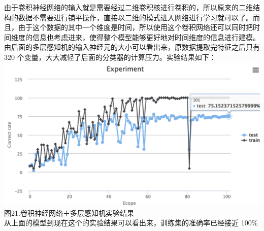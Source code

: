 由于卷积神经网络的输入就是需要经过二维卷积核进行卷积的，所以原来的二维结构的数据不需要进行铺平操作，直接以二维的模式进入网络进行学习就可以了。而且，由于这个数据的其中一个维度是时间，所以使用这个卷积网络还可以同时把时间维度的信息也考虑进来，使得整个模型能够更好地对时间维度的信息进行建模。由后面的多层感知机的输入神经元的大小可以看出来，原数据提取完特征之后只有
320
个变量，大大减轻了后面的分类器的计算压力。实验结果如下：\\\includegraphics{picture/cnn-mlp-experiment.png}\\图21.卷积神经网络＋多层感知机实验结果\\从上面的模型到现在这个的实验结果可以看出来，训练集的准确率已经接近
100\%
